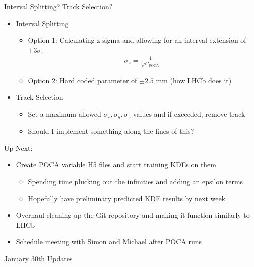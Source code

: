 \documentclass[xcolor=table,aspectratio=169]{beamer}
\begin{document}
\begin{frame}{Interval Splitting? Track Selection?}
    \begin{itemize}
        \item Interval Splitting
        \begin{itemize}
            \item Option 1: Calculating z sigma and allowing for an interval extension of \(\pm 3 \sigma_{z}\)
            \begin{align*}
                \sigma_{z} = \frac{1}{\sqrt{C_{\text{POCA}}}}
            \end{align*}
            \item Option 2: Hard coded parameter of \(\pm 2.5\) mm (how LHCb does it)
        \end{itemize}
        \item Track Selection
        \begin{itemize}
            \item Set a maximum allowed \(\sigma_{x}, \sigma_{y}, \sigma_{z}\) values and if exceeded, remove track
            \item Should I implement something along the lines of this?
        \end{itemize}
    \end{itemize}
\end{frame}

\begin{frame}{Up Next:}
    \begin{itemize}
        \item Create POCA variable H5 files and start training KDEs on them
        \begin{itemize}
            \item Spending time plucking out the infinities and adding an epsilon terms
            \item Hopefully have preliminary predicted KDE results by next week
        \end{itemize}
        \item Overhaul cleaning up the Git repository and making it function similarly to LHCb
        \item Schedule meeting with Simon and Michael after POCA runs
    \end{itemize}
\end{frame}

\begin{frame}[plain]
    \centering
    January 30th Updates
\end{frame}
\end{document}
